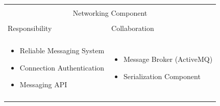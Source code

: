 \begin{tabular}{|l|l|}
    \cline{1-2}
    \multicolumn{2}{|c|}{} \\[-0.3cm]
    \multicolumn{2}{|c|}{Networking Component} \\ 
    \multicolumn{2}{|c|}{} \\[-0.3cm]
    \cline{1-2}
    Responsibility & Collaboration \\
    \cline{1-2}
    & \\[-0.2cm]
    \begin{minipage}{6.5cm}
        \begin{itemize}
          \item Reliable Messaging System
          \item Connection Authentication
          \item Messaging API
        \end{itemize} 
    \end{minipage}
	&
    \begin{minipage}{6.5cm}
        \begin{itemize}
          \item Message Broker (ActiveMQ)
          \item Serialization Component
        \end{itemize} 
    \end{minipage}
	\\ & \\
    \hline
\end{tabular}

\vspace{0.5cm}

